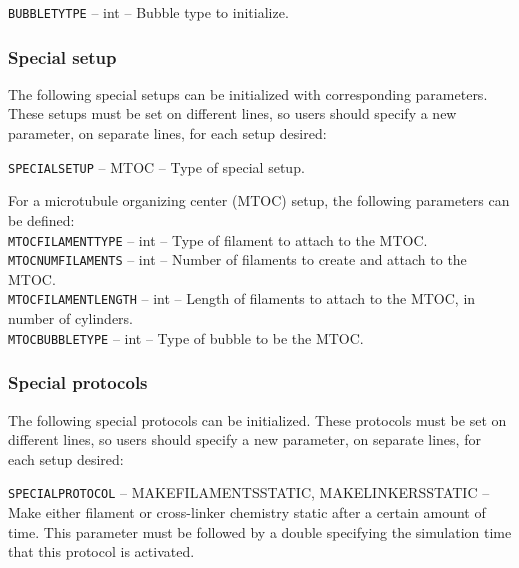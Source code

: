 \documentclass[11pt, oneside]{article}   	%
\begin{document}
   \noindent\texttt{BUBBLETYTPE} -- int -- Bubble type to initialize.\\
   
\normalsize

\subsubsection{Special setup}

The following special setups can be initialized with corresponding parameters. These setups must be set on different lines, so users should specify a new parameter, on separate lines, for each setup desired:\\

\small 

\noindent\texttt{SPECIALSETUP} -- MTOC -- Type of special setup. \\

\normalsize

\noindent For a microtubule organizing center (MTOC) setup, the following parameters can be defined:\\

\small
  \noindent\texttt{MTOCFILAMENTTYPE} -- int -- Type of filament to attach to the MTOC.\\

  \noindent\texttt{MTOCNUMFILAMENTS} -- int -- Number of filaments to create and attach to the MTOC.\\
  
  \noindent\texttt{MTOCFILAMENTLENGTH} -- int -- Length of filaments to attach to the MTOC, in number of cylinders.\\
    
  \noindent\texttt{MTOCBUBBLETYPE} -- int -- Type of bubble to be the MTOC. \\
\normalsize

\subsubsection{Special protocols}

The following special protocols can be initialized. These protocols must be set on different lines, so users should specify a new parameter, on separate lines, for each setup desired:\\

\small

\noindent\texttt{SPECIALPROTOCOL} -- MAKEFILAMENTSSTATIC, MAKELINKERSSTATIC -- Make either filament or cross-linker chemistry static after a certain amount of time. This parameter must be followed by a double specifying the simulation time that this protocol is activated.\\
\end{document}
